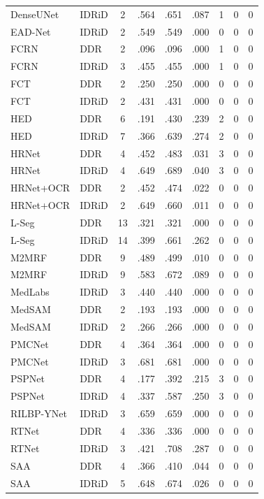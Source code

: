 {\begin{longtable}{l l c c c c c c c}
DenseUNet & IDRiD & 2 & .564 & .651 & .087 & 1 & 0 & 0 \\
EAD-Net & IDRiD & 2 & .549 & .549 & .000 & 0 & 0 & 0 \\
FCRN & DDR & 2 & .096 & .096 & .000 & 1 & 0 & 0 \\
FCRN & IDRiD & 3 & .455 & .455 & .000 & 1 & 0 & 0 \\
FCT & DDR & 2 & .250 & .250 & .000 & 0 & 0 & 0 \\
FCT & IDRiD & 2 & .431 & .431 & .000 & 0 & 0 & 0 \\
HED & DDR & 6 & .191 & .430 & .239 & 2 & 0 & 0 \\
HED & IDRiD & 7 & .366 & .639 & .274 & 2 & 0 & 0 \\
HRNet & DDR & 4 & .452 & .483 & .031 & 3 & 0 & 0 \\
HRNet & IDRiD & 4 & .649 & .689 & .040 & 3 & 0 & 0 \\
HRNet+OCR & DDR & 2 & .452 & .474 & .022 & 0 & 0 & 0 \\
HRNet+OCR & IDRiD & 2 & .649 & .660 & .011 & 0 & 0 & 0 \\
L-Seg & DDR & 13 & .321 & .321 & .000 & 0 & 0 & 0 \\
L-Seg & IDRiD & 14 & .399 & .661 & .262 & 0 & 0 & 0 \\
M2MRF & DDR & 9 & .489 & .499 & .010 & 0 & 0 & 0 \\
M2MRF & IDRiD & 9 & .583 & .672 & .089 & 0 & 0 & 0 \\
MedLabs & IDRiD & 3 & .440 & .440 & .000 & 0 & 0 & 0 \\
MedSAM & DDR & 2 & .193 & .193 & .000 & 0 & 0 & 0 \\
MedSAM & IDRiD & 2 & .266 & .266 & .000 & 0 & 0 & 0 \\
PMCNet & DDR & 4 & .364 & .364 & .000 & 0 & 0 & 0 \\
PMCNet & IDRiD & 3 & .681 & .681 & .000 & 0 & 0 & 0 \\
PSPNet & DDR & 4 & .177 & .392 & .215 & 3 & 0 & 0 \\
PSPNet & IDRiD & 4 & .337 & .587 & .250 & 3 & 0 & 0 \\
RILBP-YNet & IDRiD & 3 & .659 & .659 & .000 & 0 & 0 & 0 \\
RTNet & DDR & 4 & .336 & .336 & .000 & 0 & 0 & 0 \\
RTNet & IDRiD & 3 & .421 & .708 & .287 & 0 & 0 & 0 \\
SAA & DDR & 4 & .366 & .410 & .044 & 0 & 0 & 0 \\
SAA & IDRiD & 5 & .648 & .674 & .026 & 0 & 0 & 0 \\

\end{longtable}}
